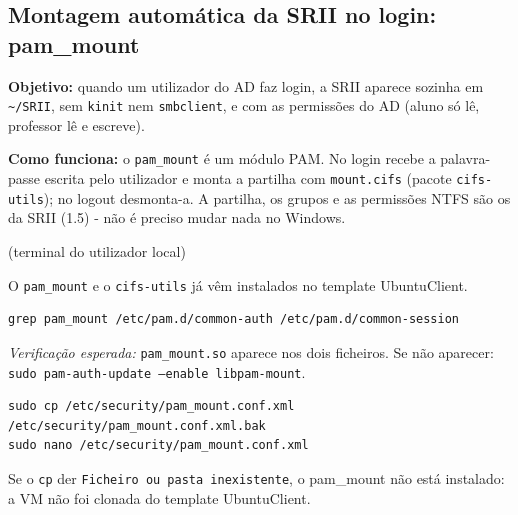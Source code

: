 
\subsection[Montagem automática da SRII no login: pam\_mount]{Montagem automática da SRII no login: pam\_mount}


\textbf{Objetivo:} quando um utilizador do AD faz login, a SRII aparece sozinha em \texttt{\textasciitilde{}/\allowbreak{}SRII}, sem \texttt{kinit} nem \texttt{smbclient}, e com as permissões do AD (aluno só lê, professor lê e escreve).

\begin{simplesbox}
\textbf{Como funciona:} o \texttt{pam\_mount} é um módulo PAM. No login recebe a palavra-passe escrita pelo utilizador e monta a partilha com \texttt{mount.cifs} (pacote \texttt{cifs-utils}); no logout desmonta-a. A partilha, os grupos e as permissões NTFS são os da SRII (1.5) - não é preciso mudar nada no Windows.
\end{simplesbox}

 (terminal do utilizador local)

O \texttt{pam\_mount} e o \texttt{cifs-utils} já vêm instalados no template UbuntuClient.

\begin{lstlisting}[style=bashstyle]
grep pam_mount /etc/pam.d/common-auth /etc/pam.d/common-session
\end{lstlisting}

\emph{Verificação esperada:} \texttt{pam\_mount.so} aparece nos dois ficheiros. Se não aparecer: \texttt{sudo pam-auth-update --enable libpam-mount}.


\begin{lstlisting}[style=bashstyle]
sudo cp /etc/security/pam_mount.conf.xml /etc/security/pam_mount.conf.xml.bak
sudo nano /etc/security/pam_mount.conf.xml
\end{lstlisting}

Se o \texttt{cp} der \texttt{Ficheiro ou pasta inexistente}, o pam\_mount não está instalado: a VM não foi clonada do template UbuntuClient.


